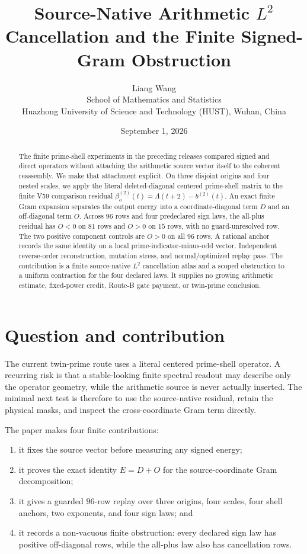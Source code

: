 \documentclass[10pt]{article}
\title{Source-Native Arithmetic $L^2$ Cancellation and the Finite Signed-Gram Obstruction}
\author{Liang Wang\\School of Mathematics and Statistics\\Huazhong University of Science and Technology (HUST), Wuhan, China}
\date{September 1, 2026}
\newcommand{\1}{\mathbf 1}
\begin{document}
\maketitle

\begin{abstract}
The finite prime-shell experiments in the preceding releases compared signed
and direct operators without attaching the arithmetic source vector itself to
the coherent reassembly.  We make that attachment explicit.  On three
disjoint origins and four nested scales, we apply the literal deleted-diagonal
centered prime-shell matrix to the finite V59 comparison residual
$\beta_o^{(2)}(t)=\Lambda(t+2)-b^{(2)}(t)$.  An exact finite Gram expansion
separates the output energy into a coordinate-diagonal term $D$ and an
off-diagonal term $O$.  Across $96$ rows and four predeclared sign laws, the
all-plus residual has $O<0$ on $81$ rows and $O>0$ on $15$ rows, with no
guard-unresolved row.  The two positive component controls are $O>0$ on all
$96$ rows.  A rational anchor records the same identity on a local
prime-indicator-minus-odd vector.  Independent reverse-order reconstruction,
mutation stress, and normal/optimized replay pass.  The contribution is a
finite source-native $L^2$ cancellation atlas and a scoped obstruction to a
uniform contraction for the four declared laws.  It supplies no growing
arithmetic estimate, fixed-power credit, Route-B gate payment, or twin-prime
conclusion.
\end{abstract}

\section{Question and contribution}

The current twin-prime route uses a literal centered prime-shell operator.  A
recurring risk is that a stable-looking finite spectral readout may describe
only the operator geometry, while the arithmetic source is never actually
inserted.  The minimal next test is therefore to use the source-native
residual, retain the physical masks, and inspect the cross-coordinate Gram
term directly.

The paper makes four finite contributions:
\begin{enumerate}
  \item it fixes the source vector before measuring any signed energy;
  \item it proves the exact identity $E=D+O$ for the source-coordinate Gram
        decomposition;
  \item it gives a guarded $96$-row replay over three origins, four scales,
        four shell anchors, two exponents, and four sign laws; and
  \item it records a non-vacuous finite obstruction: every declared sign law
        has positive off-diagonal rows, while the all-plus law also has
        cancellation rows.
\end{enumerate}
\end{document}
